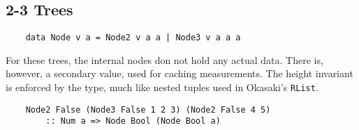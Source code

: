 \subsection{2-3 Trees}

\begin{verbatim}
    data Node v a = Node2 v a a | Node3 v a a a
\end{verbatim}

For these trees, the internal nodes don not hold any actual data. There is, however, a secondary value, used for caching measurements. The height invariant is enforced by the type, much like nested tuples used in Okasaki's \texttt{RList}.

\begin{verbatim}
    Node2 False (Node3 False 1 2 3) (Node2 False 4 5) 
        :: Num a => Node Bool (Node Bool a)
\end{verbatim}